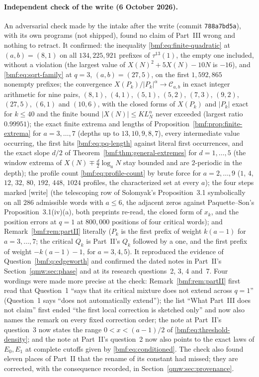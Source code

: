 \documentclass[11pt]{article}
\numberwithin{equation}{section}
\theoremstyle{definition}
\theoremstyle{remark}
\newcommand{\abs}[1]{\lvert#1\rvert}
\begin{document}
\paragraph{Independent check of the write (6 October 2026).}
An adversarial check made by the intake after the write (commit
\texttt{788a7bd5a}), with its own programs (not shipped), found no claim of
Part~III wrong and nothing to retract. It confirmed: the inequality
\eqref{bmf:eq:finite-quadratic} at $(a,b)=(8,1)$ on all
$134{,}225{,}921$ prefixes of $\tau^{13}(1)$, the empty one included,
without a violation (the largest value of $X(N)^2+5X(N)-10N$ is $-16$), and
\eqref{bmf:eq:sqrt-family} at $q=3$, $(a,b)=(27,5)$, on the first
$1{,}592{,}865$ nonempty prefixes; the convergence
$X(P_k)/\abs{P_k}^\alpha\to\mathcal C_{a,b}$ in exact integer arithmetic for
nine pairs, $(8,1)$, $(4,1)$, $(5,1)$, $(5,2)$, $(7,3)$, $(9,2)$, $(27,5)$,
$(6,1)$ and $(10,6)$, with the closed forms of $X(P_k)$ and $\abs{P_k}$
exact for $k\le40$ and the finite bound $\abs{X(N)}\le KL_N^\alpha$ never
exceeded (largest ratio $0.99951$); the exact finite extrema and lengths of
Proposition~\ref{bmf:prop:finite-extrema} for $a=3,\dots,7$ (depths up to
$13,10,9,8,7$), every intermediate value occurring, the first hits
\eqref{bmf:eq:pq-length} against literal first occurrences, and the exact
slope $d/2$ of Theorem~\ref{bmf:thm:general-extremes} for $d=1,\dots,5$
(the window extrema of $X(N)\mp\frac d2\log_aN$ stay bounded and are
$2$-periodic in the depth); the profile count
\eqref{bmf:eq:profile-count} by brute force for $a=2,\dots,9$ ($1$, $4$,
$12$, $32$, $80$, $192$, $448$, $1024$ profiles, the characterized set at
every $a$); the four steps marked [write] (the telescoping row of
Solomyak's Proposition~3.1 symbolically on all $286$ admissible words with
$a\le6$, the adjacent zeros against Paquette--Son's
Proposition~3.1(iv)(a), both preprints re-read, the closed form of $x_k$,
and the position errors at $q=1$ at $800{,}000$ positions of four critical
words); and Remark~\ref{bmf:rem:partII} literally ($P_k$ is the first
prefix of weight $k(a-1)$ for $a=3,\dots,7$; the critical $Q_k$ is Part~II's
$Q_k$ followed by a one, and the first prefix of weight $-k(a-1)-1$, for
$a=3,4,5$). It reproduced the evidence of Question~\ref{bmf:q:edgeworth} and
confirmed the dated notes in Part~II's Section~\ref{qmw:sec:phase} and at its
research questions~2, 3, 4 and~7. Four wordings were made more precise at
the check: Remark~\ref{bmf:rem:partII} first read that Question~1 ``says
that its critical mixture does not extend across $q=1$'' (Question~1 says
``does not automatically extend''); the list ``What Part~III does not
claim'' first ended ``the first local correction is sketched only'' and now
also names the remark on every fixed correction order; the note at Part~II's
question~3 now states the range $0<x<(a-1)/2$ of
\eqref{bmf:eq:threshold-density}; and the note at Part~II's question~2 now
also points to the exact laws of $E_0,E_1$ at complete cutoffs given by
\eqref{bmf:eq:conditioned}. The check also found eleven places of Part~II
that the rename of its constant had missed; they are corrected, with the
consequence recorded, in Section~\ref{qmw:sec:provenance}.
\end{document}
